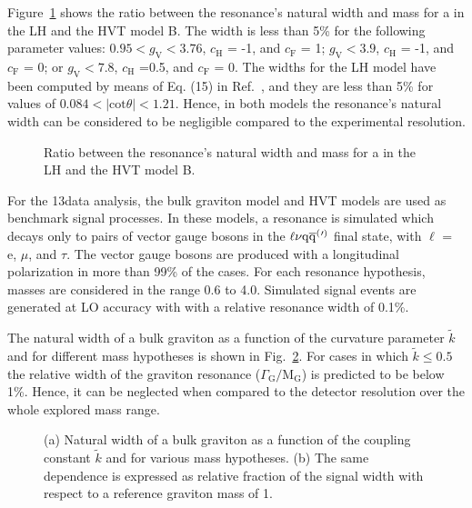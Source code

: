 Figure~\ref{fig:WHmodelsWidth} shows the ratio between the resonance's natural width and mass for a \Wpr in the LH and the HVT model B.
The width is less than 5\% for the following parameter values:
$0.95 < g_\mathrm{V} < 3.76$, $c_\mathrm{H}$ = -1, and $c_\mathrm{F}$ = 1;
$g_\mathrm{V} < 3.9$, $c_\mathrm{H}$ = -1, and $c_\mathrm{F}$ = 0;
or $g_\mathrm{V} < 7.8$, $c_\mathrm{H}$ =0.5, and $c_\mathrm{F}$ = 0.
The widths for the LH model have been computed by means of Eq. (15) in Ref.~\cite{Burdman:2002ns}, and they are less than 5\%
for values of $0.084 < |\mathrm{cot}\theta| < 1.21$. Hence, in both models the resonance's natural width can be considered to be negligible compared to the experimental resolution.\\

\begin{figure}[!htb]
\centering
{}
\caption{Ratio between the resonance's natural width and mass for a \Wpr in the LH and the HVT model B.}
\label{fig:WHmodelsWidth}
\end{figure}

For the 13\TeV data analysis, the bulk graviton model and HVT models are used as benchmark signal processes.
In these models, a resonance is simulated which decays only to pairs of vector gauge bosons in the $\ell\nu\mathrm{q}\overline{\mathrm{q}}^({}'^){}$ final state, with $\ell$ = e, $\mu$, and $\tau$.
The vector gauge bosons are produced with a longitudinal polarization in more than 99\% of the cases.
For each resonance hypothesis, masses are considered in the range 0.6 to 4.0\TeV.
Simulated signal events are generated at LO accuracy with \amcatnlo{} with a relative resonance width of 0.1\%.

The natural width of a bulk graviton as a function of the curvature parameter $\tilde{k}$ and for different mass hypotheses is shown in Fig.~\ref{fig:bulkGwidth}.
For cases in which $\tilde{k} \leq 0.5$ the relative width of the graviton resonance ($\Gamma_\mathrm{G}/\mathrm{M}_\mathrm{G}$)
is predicted to be below 1\%. Hence, it can be neglected when compared to the detector resolution over the whole explored mass range.

\begin{figure}[!htb]
\centering
{}
\caption{(a) Natural width of a bulk graviton as a function of the coupling constant $\tilde{k}$ and for various mass hypotheses. (b) The same dependence is expressed as relative fraction of the signal width with respect to a reference graviton mass of 1\TeV.}
\label{fig:bulkGwidth}
\end{figure}

